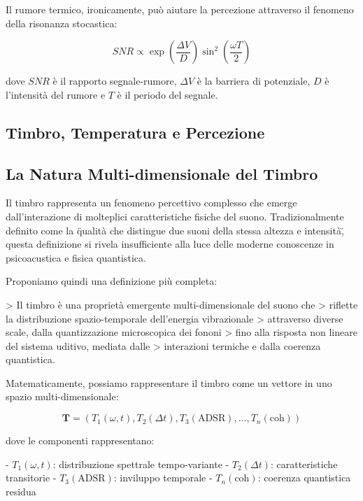 \documentclass[a4paper,11pt]{article}
\begin{document}
Il rumore termico, ironicamente, può aiutare la percezione attraverso il
fenomeno della risonanza stocastica:

\begin{equation}
SNR \propto \exp\left(\frac{\Delta V}{D}\right)\sin^2\left(\frac{\omega T}{2}\right)
\end{equation}


dove $SNR$ è il rapporto segnale-rumore, $\Delta V$ è la barriera di
potenziale, $D$ è l'intensità del rumore e $T$ è il periodo del segnale.

\subsection{Timbro, Temperatura e Percezione}

\subsection{La Natura Multi-dimensionale del Timbro}

Il timbro rappresenta un fenomeno percettivo complesso che emerge
dall'interazione di molteplici caratteristiche fisiche del suono.
Tradizionalmente definito come la \"qualità che distingue due suoni
della stessa altezza e intensità\", questa definizione si rivela
insufficiente alla luce delle moderne conoscenze in psicoacustica e
fisica quantistica.

Proponiamo quindi una definizione più completa:

> Il timbro è una proprietà emergente multi-dimensionale del suono che
> riflette la distribuzione spazio-temporale dell'energia vibrazionale
> attraverso diverse scale, dalla quantizzazione microscopica dei fononi
> fino alla risposta non lineare del sistema uditivo, mediata dalle
> interazioni termiche e dalla coerenza quantistica.

Matematicamente, possiamo rappresentare il timbro come un vettore in uno
spazio multi-dimensionale:

\begin{equation}
\mathbf{T} = \left(T_1(\omega, t), T_2(\Delta t), T_3(\text{ADSR}), ..., T_n(\text{coh})\right)
\end{equation}


dove le componenti rappresentano:

- $T_1(\omega, t)$: distribuzione spettrale tempo-variante
- $T_2(\Delta t)$: caratteristiche transitorie
- $T_3(\text{ADSR})$: inviluppo temporale
- $T_n(\text{coh})$: coerenza quantistica residua
\end{document}
